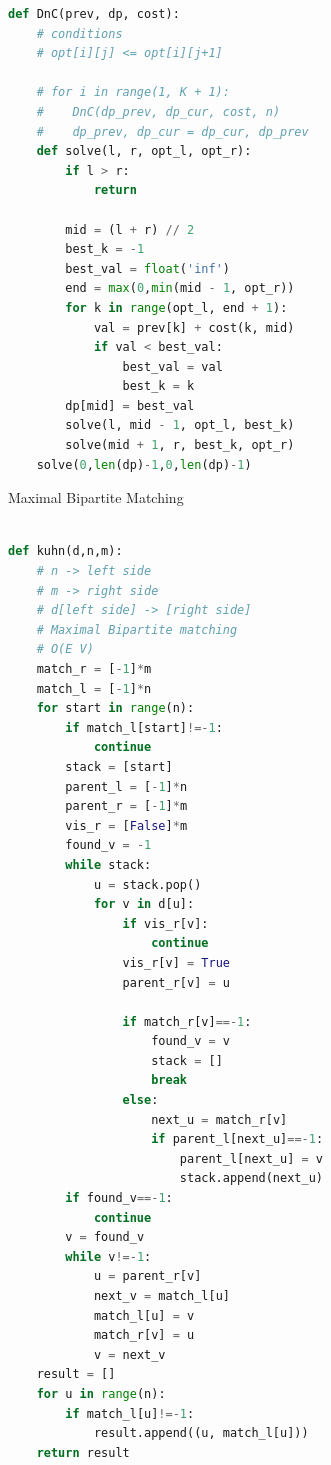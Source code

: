 \documentclass[10pt,landscape, a4paper]{article}
\begin{document}
\begin{multicols*}{3}
\begin{lstlisting}[language=Python]
def DnC(prev, dp, cost):
    # conditions
    # opt[i][j] <= opt[i][j+1]

    # for i in range(1, K + 1):
    #	 DnC(dp_prev, dp_cur, cost, n)
    #	 dp_prev, dp_cur = dp_cur, dp_prev
    def solve(l, r, opt_l, opt_r):
        if l > r:
            return

        mid = (l + r) // 2
        best_k = -1
        best_val = float('inf')
        end = max(0,min(mid - 1, opt_r))
        for k in range(opt_l, end + 1):
            val = prev[k] + cost(k, mid)
            if val < best_val:
                best_val = val
                best_k = k
        dp[mid] = best_val
        solve(l, mid - 1, opt_l, best_k)
        solve(mid + 1, r, best_k, opt_r)
    solve(0,len(dp)-1,0,len(dp)-1)
\end{lstlisting}

Maximal Bipartite Matching
\begin{lstlisting}[language=Python]

def kuhn(d,n,m):
    # n -> left side
    # m -> right side
    # d[left side] -> [right side]
    # Maximal Bipartite matching
    # O(E V)
    match_r = [-1]*m
    match_l = [-1]*n
    for start in range(n):
        if match_l[start]!=-1:
            continue
        stack = [start]
        parent_l = [-1]*n
        parent_r = [-1]*m
        vis_r = [False]*m
        found_v = -1
        while stack:
            u = stack.pop()
            for v in d[u]:
                if vis_r[v]:
                    continue
                vis_r[v] = True
                parent_r[v] = u

                if match_r[v]==-1:
                    found_v = v
                    stack = []
                    break
                else:
                    next_u = match_r[v]
                    if parent_l[next_u]==-1:
                        parent_l[next_u] = v
                        stack.append(next_u)
        if found_v==-1:
            continue
        v = found_v
        while v!=-1:
            u = parent_r[v]
            next_v = match_l[u]
            match_l[u] = v
            match_r[v] = u
            v = next_v
    result = []
    for u in range(n):
        if match_l[u]!=-1:
            result.append((u, match_l[u]))
    return result


\end{lstlisting}
\end{multicols*}
\end{document}
